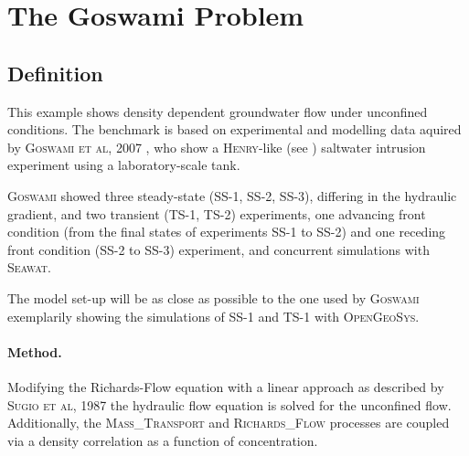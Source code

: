 

\section{The Goswami Problem}

\label{sec:Goswami}


\subsection{Definition}
This example shows density dependent groundwater flow under unconfined conditions. The benchmark is based on experimental and modelling data aquired by \textsc{Goswami et al, 2007} \cite{GosCle:2007}, who show a \textsc{Henry}-like (see \cite{PhDHenry:1960}) saltwater intrusion experiment using a laboratory-scale tank. 

\textsc{Goswami} showed three steady-state (SS-1, SS-2, SS-3), differing in the hydraulic gradient, and two transient (TS-1, TS-2) experiments, one advancing front condition (from the final states of experiments SS-1 to SS-2) and one receding front condition (SS-2 to SS-3) experiment, and concurrent simulations with \textsc{Seawat}. 

The model set-up will be as close as possible to the one used by \textsc{Goswami} exemplarily showing the simulations of SS-1 and TS-1 with \textsc{OpenGeoSys}.

\paragraph*{Method.} Modifying the Richards-Flow equation \cite{Ric:1931} with a linear approach as described by \textsc{Sugio et al, 1987} \cite{SugDes:1987} the hydraulic flow equation is solved for the unconfined flow. Additionally, the \textsc{Mass\_Transport} and \textsc{Richards\_Flow} processes are coupled via a density correlation as a function of concentration. 


